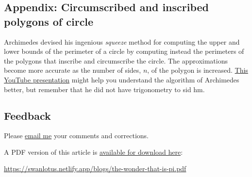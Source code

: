 \documentclass[
  a4paper,
]{article}
\begin{document}
\subsection{Appendix: Circumscribed and inscribed polygons of
circle}\label{appendix-circumscribed-and-inscribed-polygons-of-circle}

Archimedes devised his ingenious \emph{squeeze} method for computing the
upper and lower bounds of the perimeter of a circle by computing instead
the perimeters of the polygons that inscribe and circumscribe the
circle. The approximations become more accurate as the number of sides,
\(n\), of the polygon is increased.
\href{https://www.youtube.com/watch?v=_qdnyw5Eb_Y}{This YouTube
presentation} might help you understand the algorithm of Archimedes
better, but remember that he did not have trigonometry to sid hm.

\subsection{Feedback}\label{feedback}

Please \href{mailto:feedback.swanlotus@gmail.com}{email me} your
comments and corrections.

\noindent A PDF version of this article is
\href{./the-wonder-that-is-pi.pdf}{available for download here}:

\begin{small}

\begin{sffamily}

\url{https://swanlotus.netlify.app/blogs/the-wonder-that-is-pi.pdf}

\end{sffamily}

\end{small}
\end{document}
